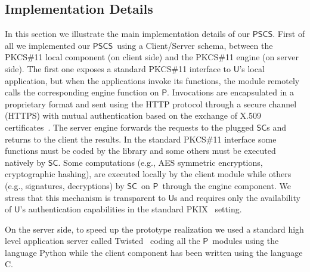 \documentclass[preprint,authoryear,12pt]{elsarticle}
\newcommand{\Owner}{\ensuremath{\mathsf{O}}}
\newcommand{\SM}{\ensuremath{\mathsf{SM}}}
\newcommand{\User}{\ensuremath{\mathsf{U}}}
\newcommand{\Proxy}{\ensuremath{\mathsf{P}}}
\newcommand{\SC}{\ensuremath{\mathsf{SC}}}
\newcommand{\PSCS}{\ensuremath{\mathsf{PSCS}}}
\begin{document}

\subsection{Implementation Details}
In this section we illustrate the main implementation details of our \PSCS. First of all we implemented our \PSCS\ using a Client/Server schema, between
the PKCS\#11 local component (on client side) and the PKCS\#11 engine (on server side). The first one exposes a standard PKCS\#11 interface to \User's local application, but when the applications invoke its functions, the module remotely calls the corresponding engine function on \Proxy . Invocations are encapsulated in a proprietary format and sent using the HTTP protocol through a secure channel (HTTPS) with mutual authentication based on the exchange of X.509 certificates~\citet{PKIX}. The server engine forwards the requests to the plugged \SC s and returns to the client the results. In the standard PKCS\#11 interface some functions must be coded by the library and some others must be executed natively by \SC . Some computations (e.g., 
AES symmetric encryptions,  cryptographic hashing), are executed locally by the client module while others (e.g., signatures, decryptions) by \SC\ on \Proxy\ through the engine component. We stress that this mechanism is transparent to \User s and requires only the availability of \User's authentication capabilities in the standard PKIX~\citet{PKIX} setting.

On the server side, to speed up the prototype realization we used a standard high level application server called Twisted~\citet{twisted} coding all the \Proxy\  modules using the language Python while the client component has been written using the language C. 
\end{document}

